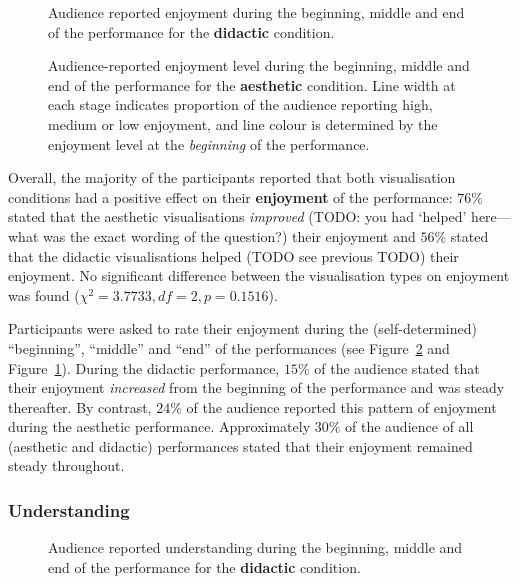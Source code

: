 \documentclass{sig-alternate}
\begin{document}
\begin{figure}
\centering
{}
\caption{Audience reported enjoyment during the beginning, middle and
  end of the performance for the \textbf{didactic} condition.}
\label{fig:didactic-enjoyment}
\end{figure}

\begin{figure}
  \centering {}
  \caption{Audience-reported enjoyment level during the beginning,
    middle and end of the performance for the \textbf{aesthetic} condition.
    Line width at each stage indicates proportion of the audience
    reporting high, medium or low enjoyment, and line colour is
    determined by the enjoyment level at the \emph{beginning} of the
    performance.}
\label{fig:aesthetic-enjoyment}
\end{figure}

Overall, the majority of the participants reported that both
visualisation conditions had a positive effect on their
\textbf{enjoyment} of the performance: $76\%$ stated that the
aesthetic visualisations \emph{improved} (TODO: you had `helped'
here---what was the exact wording of the question?) their enjoyment
and $56\%$ stated that the didactic visualisations helped (TODO see
previous TODO) their enjoyment. No significant difference between the
visualisation types on enjoyment was found
($\chi^2=3.7733,df=2,p=0.1516$).

Participants were asked to rate their enjoyment during the
(self-determined) ``beginning'', ``middle'' and ``end'' of the
performances (see Figure~\ref{fig:aesthetic-enjoyment} and
Figure~\ref{fig:didactic-enjoyment}). During the didactic
performance, $15\%$ of the audience stated that their enjoyment
\emph{increased} from the beginning of the performance and was
steady thereafter. By contrast, $24\%$ of the audience
reported this pattern of enjoyment during the aesthetic
performance. Approximately $30\%$ of the audience of all
(aesthetic and didactic) performances stated that their
enjoyment remained steady throughout.

\subsubsection{Understanding}

\begin{figure}
\centering
{}
\caption{Audience reported understanding during the beginning, middle
  and end of the performance for the \textbf{didactic} condition.}
\label{fig:didactic-understanding}
\end{figure}
\end{document}
